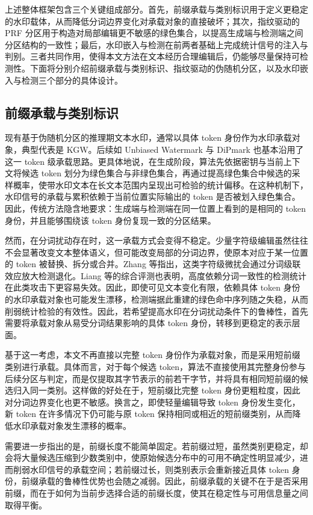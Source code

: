 上述整体框架包含三个关键组成部分。首先，前缀承载与类别标识用于定义更稳定的水印载体，从而降低分词边界变化对承载对象的直接破坏；其次，指纹驱动的 PRF 分区用于构造对局部编辑更不敏感的绿色集合，以提高生成端与检测端之间分区结构的一致性；最后，水印嵌入与检测在前两者基础上完成统计信号的注入与判别。三者共同作用，使得本文方法在文本经历合理编辑后，仍能够尽量保持可检测性。下面将分别介绍前缀承载与类别标识、指纹驱动的伪随机分区，以及水印嵌入与检测三个部分的具体设计。

\subsection{前缀承载与类别标识}

现有基于伪随机分区的推理期文本水印，通常以具体 token 身份作为水印承载对象，典型代表是 KGW\cite{kirchenbauer2023watermark}。后续如 Unbiased Watermark\cite{hu2023unbiased} 与 DiPmark\cite{wu2023dipmark} 也基本沿用了这一 token 级承载思路。更具体地说，在生成阶段，算法先依据密钥与当前上下文将候选 token 划分为绿色集合与非绿色集合，再通过提高绿色集合中候选的采样概率，使带水印文本在长文本范围内呈现出可检验的统计偏移。在这种机制下，水印信号的承载与累积依赖于当前位置实际输出的 token 是否被划入绿色集合。因此，传统方法隐含地要求：生成端与检测端在同一位置上看到的是相同的 token 身份，并且能够围绕该 token 身份复现一致的分区结果。

然而，在分词扰动存在时，这一承载方式会变得不稳定。少量字符级编辑虽然往往不会显著改变文本整体语义，但可能改变局部的分词边界，使原本对应于某一位置的 token 被替换、拆分或合并。Zhang 等指出，这类字符级微扰会通过分词级联效应放大检测退化\cite{zhang2025character}。Liang 等的综合评测也表明，高度依赖分词一致性的检测统计在此类攻击下更容易失效\cite{liang2024waterpark}。因此，即使可见文本变化有限，依赖具体 token 身份的水印承载对象也可能发生漂移，检测端据此重建的绿色命中序列随之失稳，从而削弱统计检验的有效性。因此，若希望提高水印在分词扰动条件下的鲁棒性，首先需要将承载对象从易受分词结果影响的具体 token 身份，转移到更稳定的表示层面。

基于这一考虑，本文不再直接以完整 token 身份作为承载对象，而是采用短前缀类别进行承载。具体而言，对于每个候选 token，算法不直接使用其完整身份参与后续分区与判定，而是仅提取其字节表示的前若干字节，并将具有相同短前缀的候选归入同一类别。这样做的好处在于，短前缀比完整 token 身份更粗粒度，因此对分词边界变化也更不敏感。换言之，即使轻量编辑导致 token 身份发生变化，新 token 在许多情况下仍可能与原 token 保持相同或相近的短前缀类别，从而降低水印承载对象发生漂移的概率。

需要进一步指出的是，前缀长度不能简单固定。若前缀过短，虽然类别更稳定，却会将大量候选压缩到少数类别中，使原始候选分布中的可用不确定性明显减少，进而削弱水印信号的承载空间；若前缀过长，则类别表示会重新接近具体 token 身份，前缀承载的鲁棒性优势也会随之减弱。因此，前缀承载的关键不在于是否采用前缀，而在于如何为当前步选择合适的前缀长度，使其在稳定性与可用信息量之间取得平衡。

